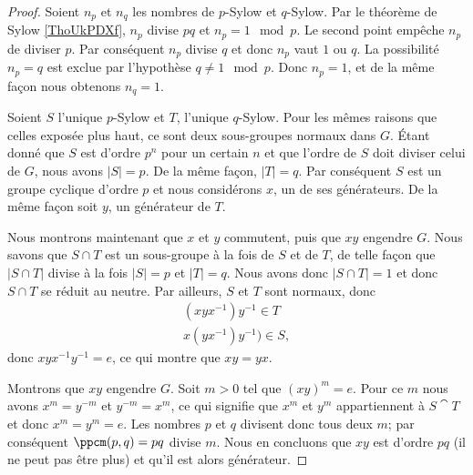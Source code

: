 \begin{proof}
    Soient \( n_p\) et \( n_q\) les nombres de \( p\)-Sylow et \( q\)-Sylow. Par le théorème de Sylow \ref{ThoUkPDXf}, \( n_p\) divise \( pq\) et \( n_p=1\mod p\). Le second point empêche \( n_p\) de diviser \( p\). Par conséquent \( n_p\) divise \( q\) et donc \( n_p\) vaut \( 1\) ou \( q\). La possibilité \( n_p=q\) est exclue par l'hypothèse \( q\neq 1\mod p\). Donc \( n_p=1\), et de la même façon nous obtenons \( n_q=1\).

    Soient \( S\) l'unique \( p\)-Sylow et \( T\), l'unique \( q\)-Sylow. Pour les mêmes raisons que celles exposée plus haut, ce sont deux sous-groupes normaux dans \( G\). Étant donné que \( S\) est d'ordre \( p^n\) pour un certain \( n\) et que l'ordre de \( S\) doit diviser celui de \( G\), nous avons \( |S|=p\). De la même façon, \( | T |=q\). Par conséquent \( S\) est un groupe cyclique d'ordre \( p\) et nous considérons \( x\), un de ses générateurs. De la même façon soit \( y\), un générateur de \( T\).

    Nous montrons maintenant que \( x\) et \( y\) commutent, puis que \( xy\) engendre \( G\). Nous savons que \( S\cap T\) est un sous-groupe à la fois de \( S\) et de \( T\), de telle façon que \( | S\cap T |\) divise à la fois \( | S |=p\) et \( | T |=q\). Nous avons donc \( | S\cap T |=1\) et donc \( S\cap T\) se réduit au neutre. Par ailleurs, \( S\) et \( T\) sont normaux, donc
    \begin{subequations}
        \begin{align}
            (xyx^{-1})y^{-1}\in T\\
            x(yx^{-1})y^{-1})\in S,
        \end{align}
    \end{subequations}
    donc \( xyx^{-1}y^{-1}=e\), ce qui montre que \( xy=yx\). 

    Montrons que \( xy\) engendre \( G\). Soit \( m>0\) tel que \( (xy)^m=e\). Pour ce \( m\) nous avons \( x^m=y^{-m}\) et \( y^{-m}=x^m\), ce qui signifie que \( x^m\) et \( y^m\) appartiennent à \( S\cat T\) et donc \( x^m=y^m=e\). Les nombres \( p\) et \( q\) divisent donc tous deux \( m\); par conséquent \( \ppcm(p,q)=pq\) divise \( m\). Nous en concluons que \( xy\) est d'ordre \( pq\) (il ne peut pas être plus) et qu'il est alors générateur.


\end{proof}
